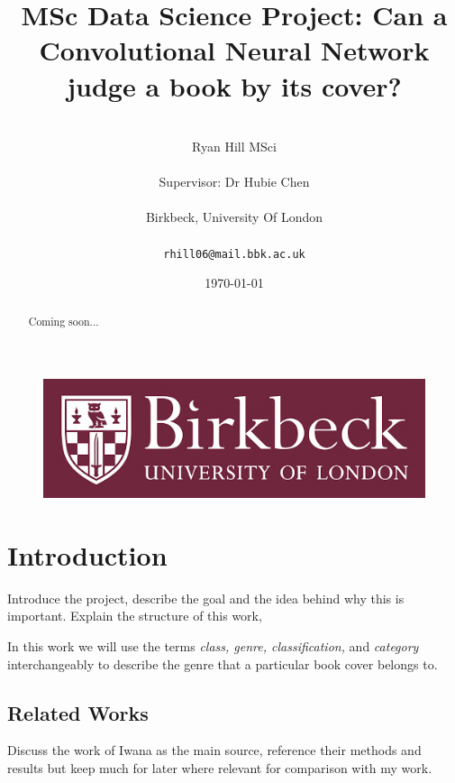 \documentclass[12pt]{article}
\numberwithin{equation}{section}
\numberwithin{figure}{section}
\begin{document}
\renewcommand\citeform[1]{[#1]}
%
\title{MSc Data Science Project: Can a Convolutional Neural Network judge a book by its cover?}
\author{\\Ryan Hill MSci\\\\
Supervisor: Dr Hubie Chen\\\\
Birkbeck, University Of London\\\\
\texttt{rhill06@mail.bbk.ac.uk}}
\date{\today}
\maketitle
\thispagestyle{empty}
\graphicspath{{images/}}
\begin{abstract}
	Coming soon...
\end{abstract}
\begin{figure}[!b]
	\centering
	\includegraphics[scale=0.4]{bbk_logo.jpg}
\end{figure}

\clearpage
%
{\hypersetup{linkcolor=black}
\tableofcontents}
\thispagestyle{empty}
\clearpage
%
\setcounter{page}{1}
\section{Introduction} 
\label{sec:intro}

Introduce the project, describe the goal and the idea behind why this is important. Explain the structure of this work,


In this work we will use the terms \emph{class, genre, classification,} and \emph{category} interchangeably to describe the genre that a particular book cover belongs to.
\subsection{Related Works} 
\label{sub:Related Works} 
Discuss the work of Iwana as the main source, reference their methods and results but keep much for later where relevant for comparison with my work.
\end{document}
